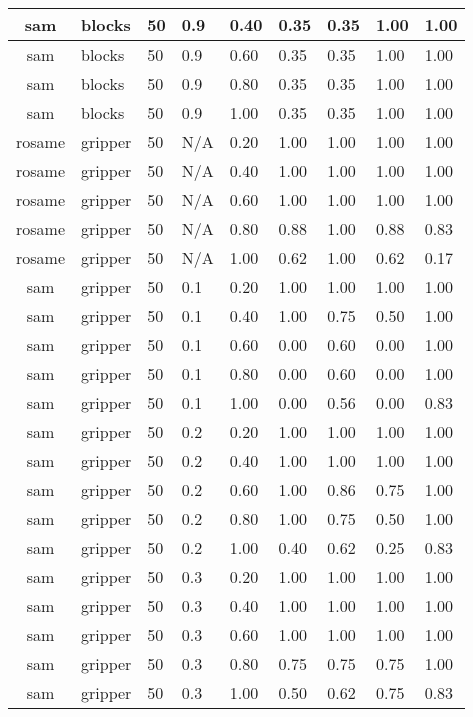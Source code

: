 \begin{table}[ht]
\begin{tabular}{c}
sam & blocks & 50 & 0.9 & 0.40 & 0.35 & 0.35 & 1.00 & 1.00 \\ \hline
sam & blocks & 50 & 0.9 & 0.60 & 0.35 & 0.35 & 1.00 & 1.00 \\ \hline
sam & blocks & 50 & 0.9 & 0.80 & 0.35 & 0.35 & 1.00 & 1.00 \\ \hline
sam & blocks & 50 & 0.9 & 1.00 & 0.35 & 0.35 & 1.00 & 1.00 \\ \hline
rosame & gripper & 50 & N/A & 0.20 & 1.00 & 1.00 & 1.00 & 1.00 \\ \hline
rosame & gripper & 50 & N/A & 0.40 & 1.00 & 1.00 & 1.00 & 1.00 \\ \hline
rosame & gripper & 50 & N/A & 0.60 & 1.00 & 1.00 & 1.00 & 1.00 \\ \hline
rosame & gripper & 50 & N/A & 0.80 & 0.88 & 1.00 & 0.88 & 0.83 \\ \hline
rosame & gripper & 50 & N/A & 1.00 & 0.62 & 1.00 & 0.62 & 0.17 \\ \hline
sam & gripper & 50 & 0.1 & 0.20 & 1.00 & 1.00 & 1.00 & 1.00 \\ \hline
sam & gripper & 50 & 0.1 & 0.40 & 1.00 & 0.75 & 0.50 & 1.00 \\ \hline
sam & gripper & 50 & 0.1 & 0.60 & 0.00 & 0.60 & 0.00 & 1.00 \\ \hline
sam & gripper & 50 & 0.1 & 0.80 & 0.00 & 0.60 & 0.00 & 1.00 \\ \hline
sam & gripper & 50 & 0.1 & 1.00 & 0.00 & 0.56 & 0.00 & 0.83 \\ \hline
sam & gripper & 50 & 0.2 & 0.20 & 1.00 & 1.00 & 1.00 & 1.00 \\ \hline
sam & gripper & 50 & 0.2 & 0.40 & 1.00 & 1.00 & 1.00 & 1.00 \\ \hline
sam & gripper & 50 & 0.2 & 0.60 & 1.00 & 0.86 & 0.75 & 1.00 \\ \hline
sam & gripper & 50 & 0.2 & 0.80 & 1.00 & 0.75 & 0.50 & 1.00 \\ \hline
sam & gripper & 50 & 0.2 & 1.00 & 0.40 & 0.62 & 0.25 & 0.83 \\ \hline
sam & gripper & 50 & 0.3 & 0.20 & 1.00 & 1.00 & 1.00 & 1.00 \\ \hline
sam & gripper & 50 & 0.3 & 0.40 & 1.00 & 1.00 & 1.00 & 1.00 \\ \hline
sam & gripper & 50 & 0.3 & 0.60 & 1.00 & 1.00 & 1.00 & 1.00 \\ \hline
sam & gripper & 50 & 0.3 & 0.80 & 0.75 & 0.75 & 0.75 & 1.00 \\ \hline
sam & gripper & 50 & 0.3 & 1.00 & 0.50 & 0.62 & 0.75 & 0.83 \\ \hline

\end{tabular}
\end{table}
